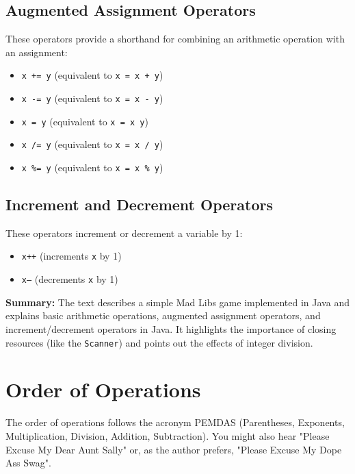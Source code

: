 \documentclass{article}
\begin{document}
\subsection{Augmented Assignment Operators}

These operators provide a shorthand for combining an arithmetic operation with an assignment:

\begin{itemize}
    \item \texttt{x += y} (equivalent to \texttt{x = x + y})
    \item \texttt{x -= y} (equivalent to \texttt{x = x - y})
    \item \texttt{x \*= y} (equivalent to \texttt{x = x \* y})
    \item \texttt{x /= y} (equivalent to \texttt{x = x / y})
    \item \texttt{x \%= y} (equivalent to \texttt{x = x \% y})
\end{itemize}

\subsection{Increment and Decrement Operators}

These operators increment or decrement a variable by 1:

\begin{itemize}
    \item \texttt{x++} (increments \texttt{x} by 1)
    \item \texttt{x--} (decrements \texttt{x} by 1)
\end{itemize}


\textbf{Summary:} The text describes a simple Mad Libs game implemented in Java and explains basic arithmetic operations, augmented assignment operators, and increment/decrement operators in Java.  It highlights the importance of closing resources (like the \texttt{Scanner}) and points out the effects of integer division.


\section{Order of Operations}

The order of operations follows the acronym PEMDAS (Parentheses, Exponents, Multiplication, Division, Addition, Subtraction).  You might also hear "Please Excuse My Dear Aunt Sally" or, as the author prefers, "Please Excuse My Dope Ass Swag".
\end{document}
